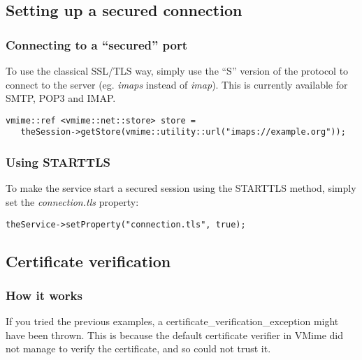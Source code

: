 \subsection{Setting up a secured connection} %

\subsubsection{Connecting to a ``secured'' port} %

To use the classical SSL/TLS way, simply use the ``S'' version of the protocol
to connect to the server (eg. \emph{imaps} instead of \emph{imap}). This is
currently available for SMTP, POP3 and IMAP.

\begin{lstlisting}
vmime::ref <vmime::net::store> store =
   theSession->getStore(vmime::utility::url("imaps://example.org"));
\end{lstlisting}

\subsubsection{Using STARTTLS} %

To make the service start a secured session using the STARTTLS method, simply
set the \emph{connection.tls} property:

\begin{lstlisting}
theService->setProperty("connection.tls", true);
\end{lstlisting}


\subsection{Certificate verification} %

\subsubsection{How it works} %

If you tried the previous examples, a
{\vcode certificate\_verification\_exception} might have been thrown.
This is because the default certificate verifier in VMime did not manage to
verify the certificate, and so could not trust it.

